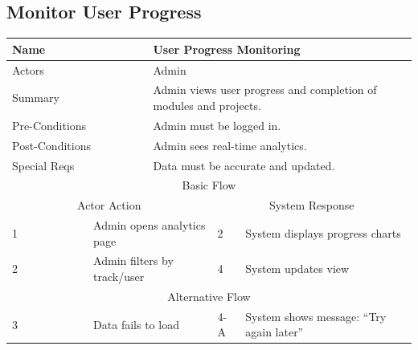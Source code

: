 \documentclass{FastFyp}
\begin{document}
\subsection{Monitor User Progress}
\noindent
\begin{minipage}{\textwidth}
\centering
{}
\label{tab:userprogress}
\begin{tabular}{|p{}|p{}|p{}|p{}|p{}|}
\hline
\multicolumn{2}{|p{0.15\textwidth}|}{Name} &
  \multicolumn{3}{p{0.75\textwidth}|}{User Progress Monitoring} \\ \hline
\multicolumn{2}{|p{0.15\textwidth}|}{Actors} &
  \multicolumn{3}{p{0.75\textwidth}|}{Admin} \\ \hline
\multicolumn{2}{|p{0.15\textwidth}|}{Summary} &
  \multicolumn{3}{p{0.75\textwidth}|}{Admin views user progress and completion of modules and projects.} \\ \hline
\multicolumn{2}{|p{0.15\textwidth}|}{Pre-Conditions} &
  \multicolumn{3}{p{0.75\textwidth}|}{Admin must be logged in.} \\ \hline
\multicolumn{2}{|p{0.15\textwidth}|}{Post-Conditions} &
  \multicolumn{3}{p{0.75\textwidth}|}{Admin sees real-time analytics.} \\ \hline
\multicolumn{2}{|p{0.15\textwidth}|}{Special Reqs} &
  \multicolumn{3}{p{0.75\textwidth}|}{Data must be accurate and updated.} \\ \hline
\multicolumn{5}{|c|}{Basic Flow} \\ \hline
\multicolumn{3}{|c|}{Actor Action} &
  \multicolumn{2}{c|}{System Response} \\ \hline
1 &
  \multicolumn{2}{p{0.42\textwidth}|}{Admin opens analytics page} &
  2 &
  System displays progress charts \\ \hline
2 &
  \multicolumn{2}{p{0.42\textwidth}|}{Admin filters by track/user} &
  4 &
  System updates view \\ \hline
\multicolumn{5}{|c|}{Alternative Flow} \\ \hline
3 &
  \multicolumn{2}{p{0.42\textwidth}|}{Data fails to load} &
  4-A &
  System shows message: “Try again later” \\ \hline
\end{tabular}
\end{minipage}

\vspace{1em}

\end{document}
